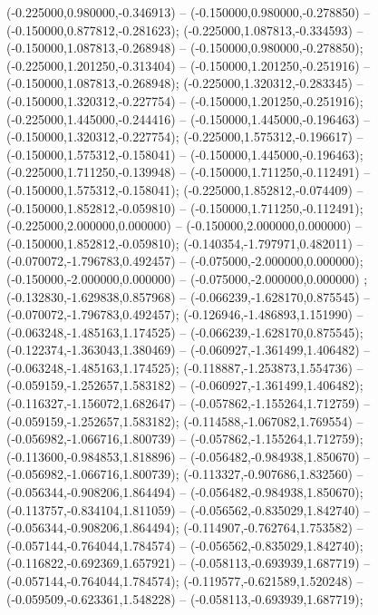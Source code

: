  (-0.225000,0.980000,-0.346913) -- (-0.150000,0.980000,-0.278850) -- (-0.150000,0.877812,-0.281623);
 (-0.225000,1.087813,-0.334593) -- (-0.150000,1.087813,-0.268948) -- (-0.150000,0.980000,-0.278850);
 (-0.225000,1.201250,-0.313404) -- (-0.150000,1.201250,-0.251916) -- (-0.150000,1.087813,-0.268948);
 (-0.225000,1.320312,-0.283345) -- (-0.150000,1.320312,-0.227754) -- (-0.150000,1.201250,-0.251916);
 (-0.225000,1.445000,-0.244416) -- (-0.150000,1.445000,-0.196463) -- (-0.150000,1.320312,-0.227754);
 (-0.225000,1.575312,-0.196617) -- (-0.150000,1.575312,-0.158041) -- (-0.150000,1.445000,-0.196463);
 (-0.225000,1.711250,-0.139948) -- (-0.150000,1.711250,-0.112491) -- (-0.150000,1.575312,-0.158041);
 (-0.225000,1.852812,-0.074409) -- (-0.150000,1.852812,-0.059810) -- (-0.150000,1.711250,-0.112491);
 (-0.225000,2.000000,0.000000) -- (-0.150000,2.000000,0.000000) -- (-0.150000,1.852812,-0.059810);
 (-0.140354,-1.797971,0.482011) -- (-0.070072,-1.796783,0.492457) -- (-0.075000,-2.000000,0.000000);
 (-0.150000,-2.000000,0.000000) -- (-0.075000,-2.000000,0.000000) ;
 (-0.132830,-1.629838,0.857968) -- (-0.066239,-1.628170,0.875545) -- (-0.070072,-1.796783,0.492457);
 (-0.126946,-1.486893,1.151990) -- (-0.063248,-1.485163,1.174525) -- (-0.066239,-1.628170,0.875545);
 (-0.122374,-1.363043,1.380469) -- (-0.060927,-1.361499,1.406482) -- (-0.063248,-1.485163,1.174525);
 (-0.118887,-1.253873,1.554736) -- (-0.059159,-1.252657,1.583182) -- (-0.060927,-1.361499,1.406482);
 (-0.116327,-1.156072,1.682647) -- (-0.057862,-1.155264,1.712759) -- (-0.059159,-1.252657,1.583182);
 (-0.114588,-1.067082,1.769554) -- (-0.056982,-1.066716,1.800739) -- (-0.057862,-1.155264,1.712759);
 (-0.113600,-0.984853,1.818896) -- (-0.056482,-0.984938,1.850670) -- (-0.056982,-1.066716,1.800739);
 (-0.113327,-0.907686,1.832560) -- (-0.056344,-0.908206,1.864494) -- (-0.056482,-0.984938,1.850670);
 (-0.113757,-0.834104,1.811059) -- (-0.056562,-0.835029,1.842740) -- (-0.056344,-0.908206,1.864494);
 (-0.114907,-0.762764,1.753582) -- (-0.057144,-0.764044,1.784574) -- (-0.056562,-0.835029,1.842740);
 (-0.116822,-0.692369,1.657921) -- (-0.058113,-0.693939,1.687719) -- (-0.057144,-0.764044,1.784574);
 (-0.119577,-0.621589,1.520248) -- (-0.059509,-0.623361,1.548228) -- (-0.058113,-0.693939,1.687719);
